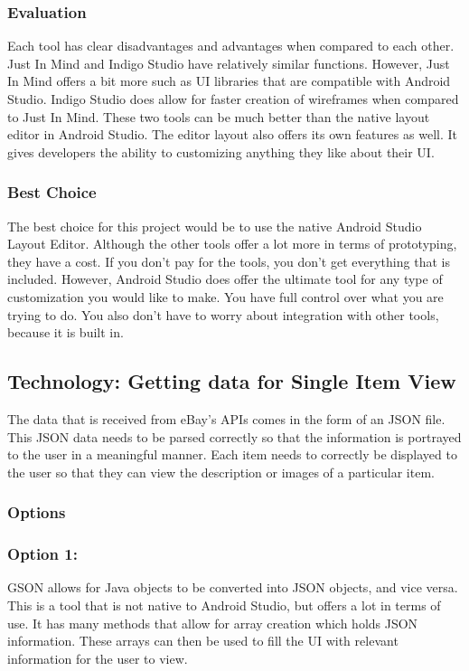 \documentclass[journal,compsoc, 10pt, draftclsnofoot, onecolumn]{IEEEtran}
\begin{document}
\subsubsection{Evaluation}
Each tool has clear disadvantages and advantages when compared to each other.
Just In Mind and Indigo Studio have relatively similar functions. However, Just
In Mind offers a bit more such as UI libraries that are compatible with Android
Studio. Indigo Studio does allow for faster creation of wireframes when compared
to Just In Mind. These two tools can be much better than the native layout
editor in Android Studio. The editor layout also offers its own features as
well. It gives developers the ability to customizing anything they like about
their UI.

\subsubsection{Best Choice}
The best choice for this project would be to use the native Android Studio
Layout Editor. Although the other tools offer a lot more in terms of
prototyping, they have a cost. If you don't pay for the tools, you don't get
everything that is included. However, Android Studio does offer the ultimate
tool for any type of customization you would like to make. You have full control
over what you are trying to do. You also don't have to worry about integration
with other tools, because it is built in.

\subsection{Technology: Getting data for Single Item View}
The data that is received from eBay's APIs comes in the form of an JSON file.
This JSON data needs to be parsed correctly so that the information is portrayed
to the user in a meaningful manner. Each item needs to correctly be displayed to
the user so that they can view the description or images of a particular item.

\subsubsection{Options}
\subsubsection*{Option 1: }
GSON allows for Java objects to be converted into JSON objects, and vice versa.
This is a tool that is not native to Android Studio, but offers a lot in terms
of use. It has many methods that allow for array creation which holds JSON
information. These arrays can then be used to fill the UI with relevant
information for the user to view.
\end{document}
